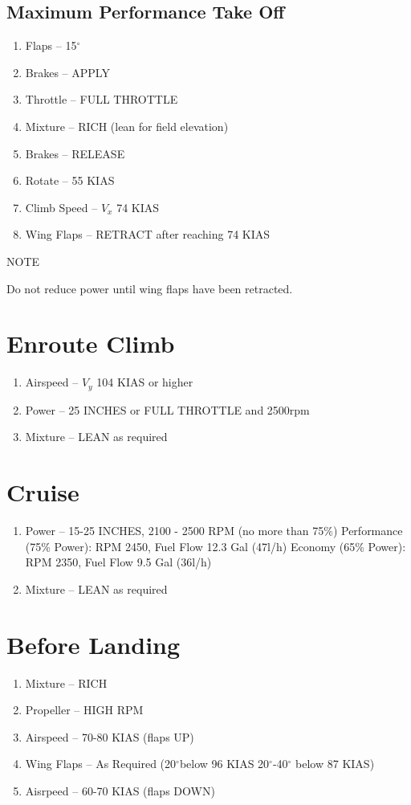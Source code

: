\subsection{Maximum Performance Take Off}
\begin{enumerate}[(1)]
  \item Flaps -- 15$^{\circ}$
  \item Brakes -- APPLY
  \item Throttle -- FULL THROTTLE  
  \item Mixture -- RICH (lean for field elevation)
  \item Brakes -- RELEASE
  \item Rotate -- 55 KIAS
  \item Climb Speed -- $V_x$ 74 KIAS 
  \item Wing Flaps -- RETRACT after reaching 74 KIAS
\end{enumerate}
\begin{center}
NOTE

Do not reduce power until wing flaps have been retracted.
\end{center}

\section{Enroute Climb}
\begin{enumerate}[(1)]
  \item Airspeed -- $V_y$ 104 KIAS or higher
  \item Power -- 25 INCHES or FULL THROTTLE and 2500rpm 
  \item Mixture -- LEAN as required
\end{enumerate}

\section{Cruise}
\begin{enumerate}[(1)]
\item Power -- 15-25 INCHES, 2100 - 2500 RPM (no more than 75\%)
\subitem Performance (75\% Power): RPM 2450, Fuel Flow 12.3 Gal (47l/h) %
\subitem Economy (65\% Power): RPM 2350, Fuel Flow 9.5 Gal (36l/h) %
\item Mixture -- LEAN as required
\end{enumerate}

\section{Before Landing}
\begin{enumerate}[(1)]
\item Mixture -- RICH
\item Propeller -- HIGH RPM
\item Airspeed -- 70-80 KIAS (flaps UP)
\item Wing Flaps -- As Required (20$^{\circ}$below 96 KIAS 20$^{\circ}$-40$^{\circ}$ below 87 KIAS)
\item Aisrpeed -- 60-70 KIAS (flaps DOWN)
\end{enumerate}

